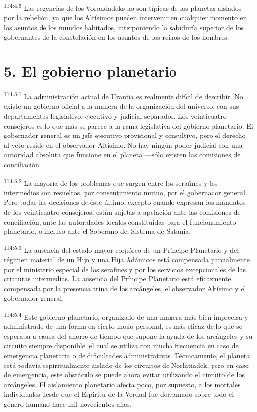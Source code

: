 \par
\textsuperscript{114:4.5} Las regencias de los Vorondadeks no son típicas de los planetas aislados por la rebelión, ya que los Altísimos pueden intervenir en cualquier momento en los asuntos de los mundos habitados, interponiendo la sabiduría superior de los gobernantes de la constelación en los asuntos de los reinos de los hombres.

\section*{5. El gobierno planetario}
\par
\textsuperscript{114:5.1} La administración actual de Urantia es realmente difícil de describir. No existe un gobierno oficial a la manera de la organización del universo, con sus departamentos legislativo, ejecutivo y judicial separados. Los veinticuatro consejeros es lo que más se parece a la rama legislativa del gobierno planetario. El gobernador general es un jefe ejecutivo provisional y consultivo, pero el derecho al veto reside en el observador Altísimo. No hay ningún poder judicial con una autoridad absoluta que funcione en el planeta ---sólo existen las comisiones de conciliación.

\par
\textsuperscript{114:5.2} La mayoría de los problemas que surgen entre los serafines y los intermedios son resueltos, por consentimiento mutuo, por el gobernador general. Pero todas las decisiones de éste último, excepto cuando expresan los mandatos de los veinticuatro consejeros, están sujetas a apelación ante las comisiones de conciliación, ante las autoridades locales constituidas para el funcionamiento planetario, o incluso ante el Soberano del Sistema de Satania.

\par
\textsuperscript{114:5.3} La ausencia del estado mayor corpóreo de un Príncipe Planetario y del régimen material de un Hijo y una Hija Adámicos está compensada parcialmente por el ministerio especial de los serafines y por los servicios excepcionales de las criaturas intermedias. La ausencia del Príncipe Planetario está eficazmente compensada por la presencia trina de los arcángeles, el observador Altísimo y el gobernador general.

\par
\textsuperscript{114:5.4} Este gobierno planetario, organizado de una manera más bien imprecisa y administrado de una forma en cierto modo personal, es más eficaz de lo que se esperaba a causa del ahorro de tiempo que supone la ayuda de los arcángeles y su circuito siempre disponible, el cual se utiliza con mucha frecuencia en caso de emergencia planetaria o de dificultades administrativas. Técnicamente, el planeta está todavía espiritualmente aislado de los circuitos de Norlatiadek, pero en caso de emergencia, este obstáculo se puede ahora evitar utilizando el circuito de los arcángeles. El aislamiento planetario afecta poco, por supuesto, a los mortales individuales desde que el Espíritu de la Verdad fue derramado sobre todo el género humano hace mil novecientos años.

